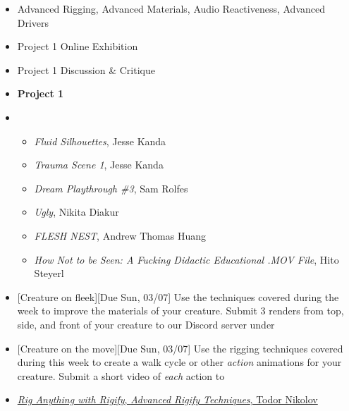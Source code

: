 \def\dMon{Mon, 03/01}
\def\dTues{Tues, 03/02}
\def\dWed{Wed, 03/03}
\def\dThur{Thur, 03/04}
\def\dFri{Fri, 03/05}
\def\dSat{Sat, 03/06}
\def\dSun{Sun, 03/07}
\placeDate

\begin{itemize}[noitemsep,topsep=0pt,leftmargin=*]
    \item {} Advanced Rigging, Advanced Materials, Audio Reactiveness, Advanced Drivers
    \item Project 1 Online Exhibition
    \item Project 1 Discussion \& Critique
    \item \textcolor{defaultColor}{\textbf{Project 1 \due{Due \dTues}}}
    \item {}
          \begin{itemize}
              \item \emph{Fluid Silhouettes}, Jesse Kanda
              \item \emph{Trauma Scene 1}, Jesse Kanda
              \item \emph{Dream Playthrough \#3}, Sam Rolfes
              \item \emph{Ugly}, Nikita Diakur
              \item \emph{FLESH NEST}, Andrew Thomas Huang
              \item \emph{How Not to be Seen: A Fucking Didactic Educational .MOV File}, Hito Steyerl
          \end{itemize}
    \item {}[Creature on fleek][Due \dSun]
          \newline Use the techniques covered during the week to improve the materials of your creature. Submit 3 renders from top, side, and front of your creature to our Discord server under \discordC
    \item {}[Creature on the move][Due \dSun]
          \newline Use the rigging techniques covered during this week to create a walk cycle or other \emph{action} animations for your creature. Submit a short video of \emph{each} action to \discordC
    \item {} \href{https://www.youtube.com/playlist?list=PLdcL5aF8ZcJv68SSdwxip33M7snakl6Dx}{\emph{Rig Anything with Rigify}, \emph{\href{https://www.youtube.com/playlist?list=PLdcL5aF8ZcJttvb-rgvyA1NkRi77zVP-J}{Advanced Rigify Techniques}}, Todor Nikolov }
\end{itemize}